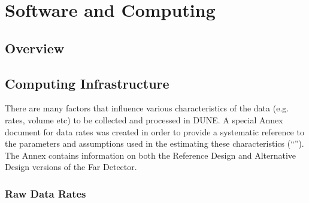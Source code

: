 \chapter{Software and Computing}
\label{ch:detectors-sc}

\section{Overview}


\section{Computing Infrastructure}
\label{sec:detectors-sc-infrastructure}

There are many factors that influence various characteristics of the data (e.g. rates, volume etc)
to be collected and processed in DUNE.
A special Annex document for data rates was created in order to provide a systematic reference
to the parameters and assumptions used in the estimating these characteristics (``\anxrates'').
The Annex contains information on both the Reference Design and Alternative Design
versions of the Far Detector.

\subsection{Raw Data Rates}
\label{sec:detectors-sc-infrastructure-data-rates}


